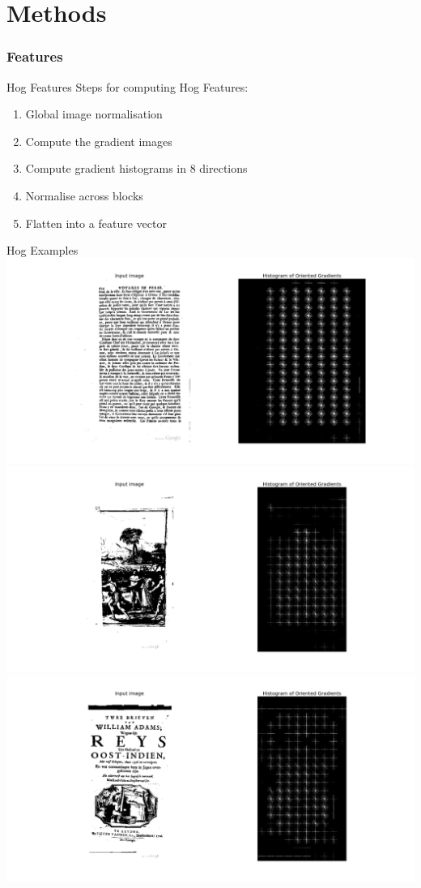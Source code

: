 \documentclass{beamer}
\newcommand{\slide}[2]
{
\begin{frame}
\frametitle{#1} 

#2

\end{frame}
}
\begin{document}
\section{Methods}
\slide{Features}
{
	\begin{block}{Hog Features}
	Steps for computing Hog Features\cite{dalal2005histograms}:
	\begin{enumerate}
		\item Global image normalisation
		\item Compute the gradient images
		\item Compute gradient histograms in 8 directions
		\item Normalise across blocks
		\item Flatten into a feature vector
	\end{enumerate}
	\end{block}
}
\begin{frame}[allowframebreaks]{Hog Examples}
	\includegraphics[trim=85px 0cm 0cm 0cm, clip=true, width=.8\paperwidth]{resources/text1}\\
\framebreak
	\includegraphics[width=.8\paperwidth]{resources/image1}\\
\framebreak
	\includegraphics[width=.8\paperwidth]{resources/text_and_image1}
\end{frame}
\end{document}
